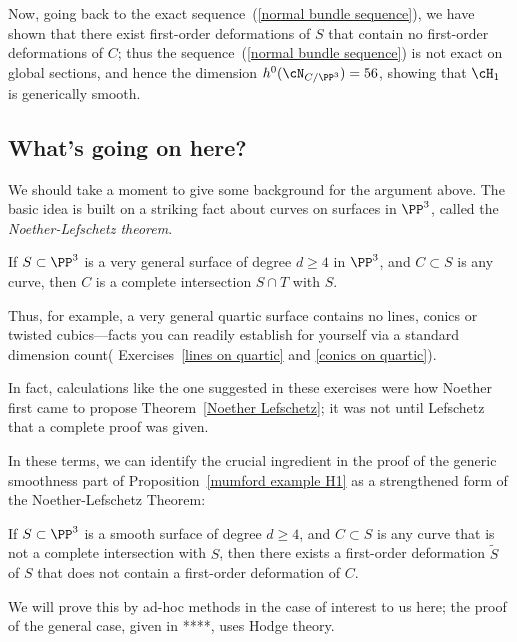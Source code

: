 Now, going back to the exact sequence~(\ref{normal bundle sequence}), we have shown that there exist first-order deformations of $S$ that contain no first-order deformations of $C$; thus the sequence~(\ref{normal bundle sequence}) is not exact on global sections, and hence the dimension $h^0(\cN_{C/\PP^3}) = 56$, showing that $\cH_1$ is generically smooth.

\subsection{What's going on here?}

We should take a moment to give some background for the  argument above. The basic idea is built on a striking fact about curves on surfaces in $\PP^3$, called the \emph{Noether-Lefschetz theorem}.

\begin{theorem}\label{Noether Lefschetz}
If $S \subset \PP^3$ is a very general surface of degree $d \geq 4$ in $\PP^3$, and $C \subset S$ is any curve, then $C$ is a complete intersection $S \cap T$ with $S$.
\end{theorem}

Thus, for example, a very general quartic surface contains no lines, conics or twisted cubics---facts you can readily establish for yourself via a standard dimension count( Exercises~\ref{lines on quartic} and \ref{conics on quartic}).


In fact, calculations like the one suggested in these exercises were how Noether first came to propose Theorem~\ref{Noether Lefschetz}; it was not until Lefschetz that a complete proof was given.

In these terms, we can identify the crucial ingredient in the proof of the generic smoothness part of Proposition~\ref{mumford example H1} as a strengthened form of the Noether-Lefschetz Theorem:

\begin{theorem}
If $S \subset \PP^3$ is a smooth surface of degree $d \geq 4$, and $C \subset S$ is any curve that is not a complete intersection with $S$, then there exists a first-order deformation $\tilde S$ of $S$ that does not contain a first-order deformation of $C$.
\end{theorem}

We will prove this by ad-hoc methods in the case of interest to us here; the proof of the general case, given in ****, uses Hodge theory.

